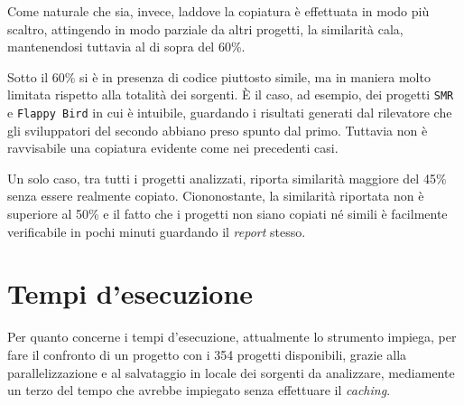 Come naturale che sia, invece, laddove la copiatura è effettuata in modo più scaltro, attingendo in modo parziale da altri progetti, la similarità cala, mantenendosi tuttavia al di sopra del 60\%.

Sotto il 60\% si è in presenza di codice piuttosto simile, ma in maniera molto limitata rispetto alla totalità dei sorgenti.
%
\`E il caso, ad esempio, dei progetti \texttt{SMR} e \texttt{Flappy Bird} in cui è intuibile, guardando i risultati generati dal rilevatore che gli sviluppatori del secondo abbiano preso spunto dal primo.
%
Tuttavia non è ravvisabile una copiatura evidente come nei precedenti casi.

Un solo caso, tra tutti i progetti analizzati, riporta similarità maggiore del 45\% senza essere realmente copiato.
%
Ciononostante, la similarità riportata non è superiore al 50\% e il fatto che i progetti non siano copiati né simili è facilmente verificabile in pochi minuti guardando il \textit{report} stesso.

\section{Tempi d'esecuzione}
Per quanto concerne i tempi d'esecuzione, attualmente lo strumento impiega, per fare il confronto di un progetto con i 354 progetti disponibili, grazie alla parallelizzazione e al salvataggio in locale dei sorgenti da analizzare, mediamente un terzo del tempo che avrebbe impiegato senza effettuare il \textit{caching}.

